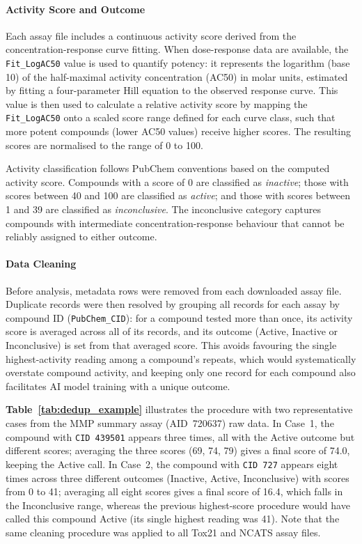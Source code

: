 \documentclass[letterpaper]{article}
\begin{document}
\paragraph{Activity Score and Outcome}

Each assay file includes a continuous activity score derived from the concentration-response curve fitting. When dose-response data are available, the \texttt{Fit\_LogAC50} value is used to quantify potency: it represents the logarithm (base 10) of the half-maximal activity concentration (AC50) in molar units, estimated by fitting a four-parameter Hill equation to the observed response curve. This value is then used to calculate a relative activity score by mapping the \texttt{Fit\_LogAC50} onto a scaled score range defined for each curve class, such that more potent compounds (lower AC50 values) receive higher scores. The resulting scores are normalised to the range of 0 to 100.

Activity classification follows PubChem conventions based on the
computed activity score. Compounds with a score of 0 are classified as \textit{inactive}; those with scores between 40 and 100 are classified as \textit{active}; and those with scores between 1 and 39 are classified as \textit{inconclusive}. The inconclusive category captures compounds with intermediate concentration-response behaviour that cannot be reliably assigned to either outcome.

\paragraph{Data Cleaning}

Before analysis, metadata rows were removed from each downloaded assay file. Duplicate records were then resolved by grouping all records for each assay by compound ID (\texttt{PubChem\_CID}): for a compound tested more than once, its activity score is averaged across all of its records, and its outcome (Active, Inactive or Inconclusive) is set from that averaged score. This avoids favouring the single highest-activity reading among a compound's repeats, which would systematically overstate compound activity, and keeping only one record for each compound also facilitates AI model training with a unique outcome.

\textbf{Table~\ref{tab:dedup_example}} illustrates the procedure with two representative cases from the MMP summary assay (AID~720637) raw data. In Case~1, the compound with \texttt{CID 439501} appears three times, all with the Active outcome but different scores; averaging the three scores (69, 74, 79) gives a final score of 74.0, keeping the Active call. In Case~2, the compound with \texttt{CID 727} appears eight times across three different outcomes (Inactive, Active, Inconclusive) with scores from 0 to 41; averaging all eight scores gives a final score of 16.4, which falls in the Inconclusive range, whereas the previous highest-score procedure would have called this compound Active (its single highest reading was 41). Note that the same cleaning procedure was applied to all Tox21 and NCATS assay files.
\end{document}
